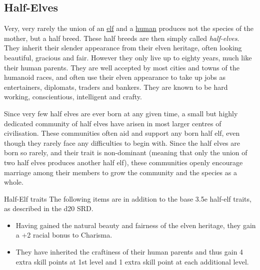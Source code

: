 \subsection{Half-Elves}
\label{sec:Half-Elves}

Very, very rarely the union of an \hyperref[sec:Elves]{elf} and a
\hyperref[sec:Humans]{human} produces not the species of the mother, but a
half breed. These half breeds are then simply called \emph{half-elves}. They
inherit their slender appearance from their elven heritage, often looking
beautiful, gracious and fair. However they only live up to eighty years,
much like their human parents. They are well accepted by most cities and towns
of the humanoid races, and often use their elven appearance to take up jobs as
entertainers, diplomats, traders and bankers. They are known to be hard working,
conscientious, intelligent and crafty.

Since very few half elves are ever born at any given time, a small but highly
dedicated community of half elves have arisen in most larger centres of
civilisation. These communities often aid and support any born half elf, even
though they rarely face any difficulties to begin with. Since the half elves
are born so rarely, and their trait is non-dominant (meaning that only the
union of two half elves produces another half elf), these communities openly
encourage marriage among their members to grow the community and the species
as a whole.

\begin{35e}{Half-Elf traits}
  The following items are in addition to the base 3.5e half-elf traits, as
  described in the d20 SRD.
  \begin{itemize}[noitemsep]
  \item Having gained the natural beauty and fairness of the elven heritage,
    they gain a +2 racial bonus to Charisma.
  \item They have inherited the craftiness of their human parents and thus
    gain 4 extra skill points at 1st level and 1 extra skill point at each
    additional level.
  \end{itemize}
\end{35e}
